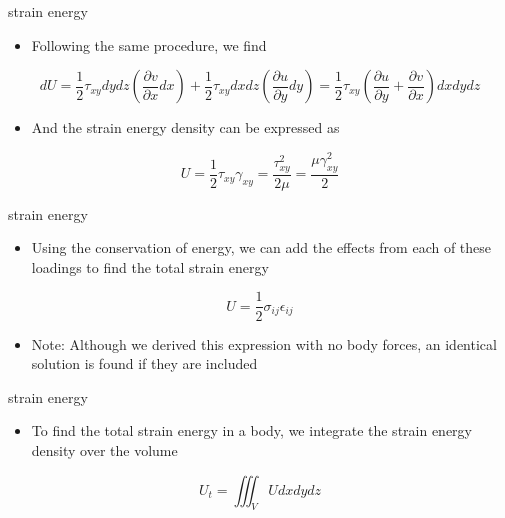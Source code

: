 \documentclass[
  letterpaper,
  ignorenonframetext,
  aspectratio=43,
  handout,
  12pt]{beamer}
\providecommand{\tightlist}{%
  \setlength{\itemsep}{0pt}\setlength{\parskip}{0pt}}
\providecommand{\tightlist}{%
\setlength{\itemsep}{0pt}\setlength{\parskip}{0pt}}
\begin{document}
\begin{frame}{strain energy}
\protect\hypertarget{strain-energy-8}{}
\begin{itemize}
\tightlist
\item
  Following the same procedure, we find
\end{itemize}

\[dU = \frac{1}{2} \tau_{xy} dydz \left(\frac{\partial v}{\partial x} dx\right) + \frac{1}{2} \tau_{xy} dxdz \left(\frac{\partial u}{\partial y} dy\right) = \frac{1}{2} \tau_{xy} \left(\frac{\partial u}{\partial y} + \frac{\partial v}{\partial x} \right) dx dy dz\]

\begin{itemize}
\tightlist
\item
  And the strain energy density can be expressed as
\end{itemize}

\[U = \frac{1}{2}\tau_{xy}\gamma_{xy} = \frac{\tau_{xy}^2}{2\mu} = \frac{\mu \gamma_{xy}^2}{2}\]
\end{frame}

\begin{frame}{strain energy}
\protect\hypertarget{strain-energy-9}{}
\begin{itemize}
\tightlist
\item
  Using the conservation of energy, we can add the effects from each of
  these loadings to find the total strain energy
\end{itemize}

\[U = \frac{1}{2} \sigma_{ij} \epsilon_{ij}\]

\begin{itemize}
\tightlist
\item
  Note: Although we derived this expression with no body forces, an
  identical solution is found if they are included
\end{itemize}
\end{frame}

\begin{frame}{strain energy}
\protect\hypertarget{strain-energy-10}{}
\begin{itemize}
\tightlist
\item
  To find the total strain energy in a body, we integrate the strain
  energy density over the volume
\end{itemize}

\[U_t = \iiint_V U dx dy dz \]
\end{frame}
\end{document}
